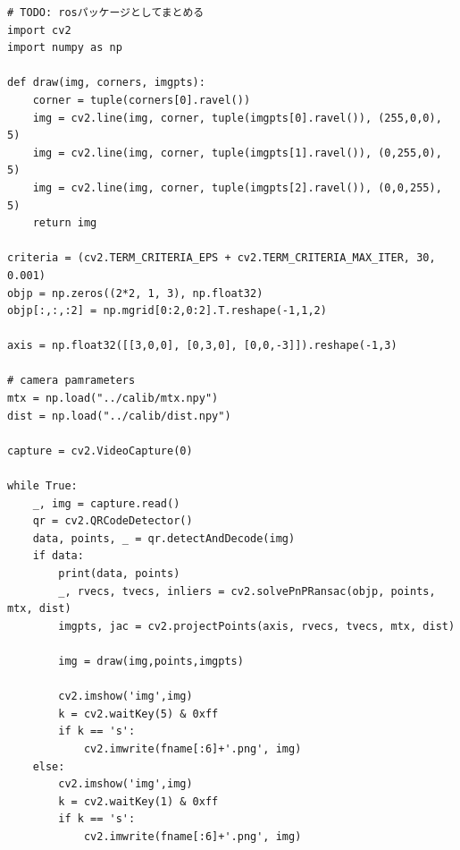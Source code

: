 \begin{lstlisting}[caption=pnp\_qr.py,label=src_pnp]
# TODO: rosパッケージとしてまとめる
import cv2
import numpy as np

def draw(img, corners, imgpts):
    corner = tuple(corners[0].ravel())
    img = cv2.line(img, corner, tuple(imgpts[0].ravel()), (255,0,0), 5)
    img = cv2.line(img, corner, tuple(imgpts[1].ravel()), (0,255,0), 5)
    img = cv2.line(img, corner, tuple(imgpts[2].ravel()), (0,0,255), 5)
    return img

criteria = (cv2.TERM_CRITERIA_EPS + cv2.TERM_CRITERIA_MAX_ITER, 30, 0.001)
objp = np.zeros((2*2, 1, 3), np.float32)
objp[:,:,:2] = np.mgrid[0:2,0:2].T.reshape(-1,1,2)

axis = np.float32([[3,0,0], [0,3,0], [0,0,-3]]).reshape(-1,3)

# camera pamrameters
mtx = np.load("../calib/mtx.npy")
dist = np.load("../calib/dist.npy")

capture = cv2.VideoCapture(0)

while True:
    _, img = capture.read()
    qr = cv2.QRCodeDetector()
    data, points, _ = qr.detectAndDecode(img)
    if data:
        print(data, points)
        _, rvecs, tvecs, inliers = cv2.solvePnPRansac(objp, points, mtx, dist)
        imgpts, jac = cv2.projectPoints(axis, rvecs, tvecs, mtx, dist)

        img = draw(img,points,imgpts)

        cv2.imshow('img',img)
        k = cv2.waitKey(5) & 0xff
        if k == 's':
            cv2.imwrite(fname[:6]+'.png', img)
    else:
        cv2.imshow('img',img)
        k = cv2.waitKey(1) & 0xff
        if k == 's':
            cv2.imwrite(fname[:6]+'.png', img)
\end{lstlisting}
